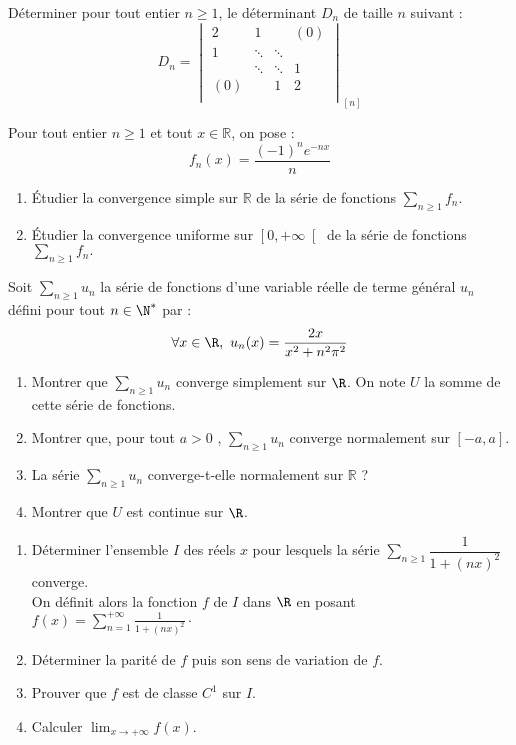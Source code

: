 \documentclass[twoside,a4paper,french,10pt]{VcCours}
\begin{document}
\begin{Exercice}
    Déterminer pour tout entier $n \geq 1$, le déterminant $D_n$ de taille $n$ suivant :
    \[
        D_n =
        \begin{vmatrix}
            2 & 1 & {} & {(0)} \\
            1 & \ddots & \ddots & {} \\
            {} & \ddots & \ddots & 1 \\
            {(0)} & {} & 1 & 2 \\
        \end{vmatrix}_{[n]}
    \]
\end{Exercice} 

\begin{Exercice}
Pour tout entier $n \geq 1$ et tout $x \in \mathbb{R}$, on pose :
$$ f_n(x) = \dfrac{\left(-1\right)^{n}e^{-nx}}{n} $$

\begin{enumerate}
\item Étudier la convergence simple sur $\mathbb{R}$  de la série de fonctions $\sum_{n\geq 1} f_n.$
\item Étudier la convergence uniforme sur $\left[ 0,+\infty\right[ $  de la série de fonctions $\sum_{n\geq 1} f_n.$
\end{enumerate}
\end{Exercice} 

\begin{Exercice}
Soit $\sum_{n \geq 1} u_n$ la série de fonctions d'une variable réelle de terme général $u_n$ défini pour tout $n \in \N^*$ par : 
$$ \forall x \in \R ,\ u_n(x)=\dfrac{2x}{x^2+n^2\pi^2}$$
\begin{enumerate}
\item Montrer que $\sum_{n \geq 1} u_n$ converge simplement sur $\R$. On note $U$ la somme de cette  série de fonctions.
\item Montrer que, pour tout $a > 0$ , $\sum_{n \geq 1} u_n$ converge normalement sur $[-a,a]$.
\item La série $\sum_{n \geq 1} u_n$ converge-t-elle normalement sur $\mathbb{R}$ ?
\item Montrer que $U$ est continue sur $\R$.
\end{enumerate}
\end{Exercice} 

\begin{Exercice}
\begin{enumerate}
    \item Déterminer l'ensemble $I$ des réels $x$ pour lesquels la série $\sum_{n\geq 1} \dfrac{1}{1+(nx)^2}$ converge.\\
    On définit alors la fonction $f$ de $I$ dans $\R$ en posant $f(x)=\sum_{n=1}^{+\infty}\frac{1}{1+(nx)^2}\cdot$
    \item Déterminer la parité de $f$ puis son sens de variation de $f$. 
    \item Prouver que $f$ est de classe $C^1$ sur $I$.
    \item Calculer $\lim_{x\to +\infty}f(x)$.
    \end{enumerate}
\end{Exercice} 
\end{document}
